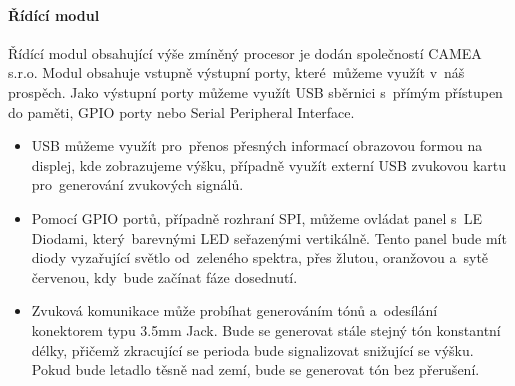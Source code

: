			\paragraph{Řídící modul}
				Řídící modul obsahující výše zmíněný procesor je dodán společností CAMEA s.r.o. Modul obsahuje vstupně výstupní porty, které~můžeme využít v~náš prospěch. Jako výstupní porty můžeme využít USB sběrnici s~přímým přístupen do paměti, GPIO porty nebo Serial Peripheral Interface. 
				\begin{itemize}
					\item USB můžeme využít pro~přenos přesných informací obrazovou formou na displej, kde zobrazujeme výšku, případně využít externí USB zvukovou kartu pro~generování zvukových signálů. 
					
					\item Pomocí GPIO portů, případně rozhraní SPI, můžeme ovládat panel s~LE Diodami, který~barevnými LED seřazenými vertikálně. Tento panel bude mít diody vyzařující světlo od~zeleného spektra, přes žlutou, oranžovou a~sytě červenou, kdy~bude začínat fáze dosednutí.
					
					\item Zvuková komunikace může probíhat generováním tónů a~odesílání konektorem typu 3.5mm Jack. Bude se generovat stále stejný tón konstantní délky, přičemž zkracující se perioda bude signalizovat snižující se výšku. Pokud bude letadlo těsně nad zemí, bude se generovat tón bez přerušení.
				\end{itemize}
				
